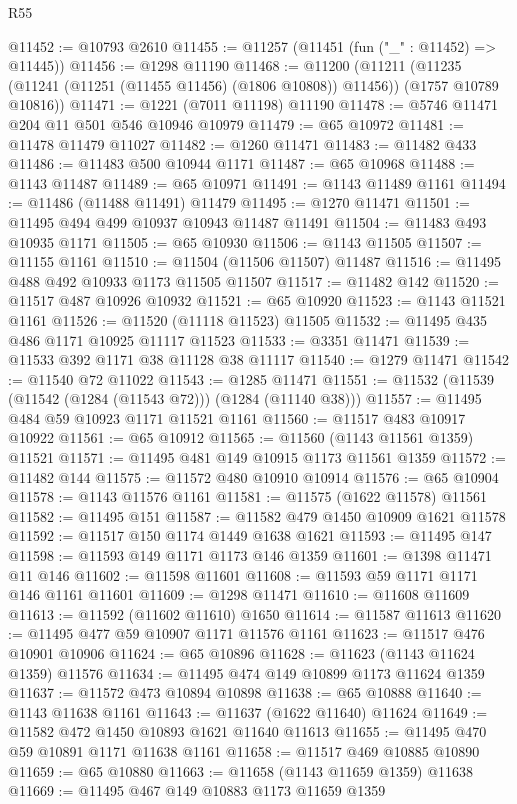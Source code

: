 \begin{lexlean}{R55}
\begin{coremodule}
@11452 := @10793 @2610
@11455 := @11257 (@11451 (fun ("_" : @11452) => @11445))
@11456 := @1298 @11190
@11468 := @11200
    (@11211 (@11235 (@11241 (@11251 (@11455 @11456) (@1806 @10808)) @11456)) (@1757 @10789 @10816))
@11471 := @1221 (@7011 @11198) @11190
@11478 := @5746 @11471 @204 @11 @501 @546 @10946 @10979
@11479 := @65 @10972
@11481 := @11478 @11479 @11027
@11482 := @1260 @11471
@11483 := @11482 @433
@11486 := @11483 @500 @10944 @1171
@11487 := @65 @10968
@11488 := @1143 @11487
@11489 := @65 @10971
@11491 := @1143 @11489 @1161
@11494 := @11486 (@11488 @11491) @11479
@11495 := @1270 @11471
@11501 := @11495 @494 @499 @10937 @10943 @11487 @11491
@11504 := @11483 @493 @10935 @1171
@11505 := @65 @10930
@11506 := @1143 @11505
@11507 := @11155 @1161
@11510 := @11504 (@11506 @11507) @11487
@11516 := @11495 @488 @492 @10933 @1173 @11505 @11507
@11517 := @11482 @142
@11520 := @11517 @487 @10926 @10932
@11521 := @65 @10920
@11523 := @1143 @11521 @1161
@11526 := @11520 (@11118 @11523) @11505
@11532 := @11495 @435 @486 @1171 @10925 @11117 @11523
@11533 := @3351 @11471
@11539 := @11533 @392 @1171 @38 @11128 @38 @11117
@11540 := @1279 @11471
@11542 := @11540 @72 @11022
@11543 := @1285 @11471
@11551 := @11532 (@11539 (@11542 (@1284 (@11543 @72))) (@1284 (@11140 @38)))
@11557 := @11495 @484 @59 @10923 @1171 @11521 @1161
@11560 := @11517 @483 @10917 @10922
@11561 := @65 @10912
@11565 := @11560 (@1143 @11561 @1359) @11521
@11571 := @11495 @481 @149 @10915 @1173 @11561 @1359
@11572 := @11482 @144
@11575 := @11572 @480 @10910 @10914
@11576 := @65 @10904
@11578 := @1143 @11576 @1161
@11581 := @11575 (@1622 @11578) @11561
@11582 := @11495 @151
@11587 := @11582 @479 @1450 @10909 @1621 @11578
@11592 := @11517 @150 @1174 @1449 @1638 @1621
@11593 := @11495 @147
@11598 := @11593 @149 @1171 @1173 @146 @1359
@11601 := @1398 @11471 @11 @146
@11602 := @11598 @11601
@11608 := @11593 @59 @1171 @1171 @146 @1161 @11601
@11609 := @1298 @11471
@11610 := @11608 @11609
@11613 := @11592 (@11602 @11610) @1650
@11614 := @11587 @11613
@11620 := @11495 @477 @59 @10907 @1171 @11576 @1161
@11623 := @11517 @476 @10901 @10906
@11624 := @65 @10896
@11628 := @11623 (@1143 @11624 @1359) @11576
@11634 := @11495 @474 @149 @10899 @1173 @11624 @1359
@11637 := @11572 @473 @10894 @10898
@11638 := @65 @10888
@11640 := @1143 @11638 @1161
@11643 := @11637 (@1622 @11640) @11624
@11649 := @11582 @472 @1450 @10893 @1621 @11640 @11613
@11655 := @11495 @470 @59 @10891 @1171 @11638 @1161
@11658 := @11517 @469 @10885 @10890
@11659 := @65 @10880
@11663 := @11658 (@1143 @11659 @1359) @11638
@11669 := @11495 @467 @149 @10883 @1173 @11659 @1359

\end{coremodule}
\end{lexlean}
